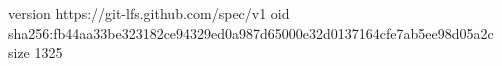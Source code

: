 version https://git-lfs.github.com/spec/v1
oid sha256:fb44aa33be323182ce94329ed0a987d65000e32d0137164cfe7ab5ee98d05a2c
size 1325
